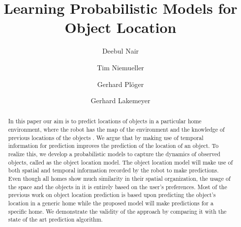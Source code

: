 \documentclass{llncs}
\begin{document}
\title{Learning Probabilistic Models for Object Location }
%
%
\author{Deebul Nair \and Tim Niemueller 
\and Gerhard Pl\"{o}ger  \and Gerhard Lakemeyer }
%
%
%
\maketitle              %

\begin{abstract}
In this paper our aim is to predict locations of objects in a particular home environment, where the robot has the map of the environment and the knowledge of previous locations of the objects . We argue that by making use of temporal information for prediction improves the prediction of the location of an object. To realize this, we develop a probabilistic models to capture the dynamics of observed objects, called as the object location model. The object location model will make use of both spatial and temporal information recorded by the robot to make predictions. Even though all homes show much similarity in their spatial organization, the usage of the space and the objects in it is entirely based on the user’s preferences. Most of the previous work on object location prediction is based upon predicting the object’s location in a generic home while the proposed model will make predictions for a specific home. We demonstrate the validity of the approach by comparing it with the state of the art prediction algorithm. 
\end{abstract}
%
\end{document}

